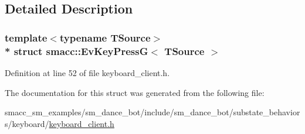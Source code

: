\subsection{Detailed Description}
\subsubsection*{template$<$typename T\+Source$>$\\*
struct smacc\+::\+Ev\+Key\+Press\+G$<$ T\+Source $>$}



Definition at line 52 of file keyboard\+\_\+client.\+h.



The documentation for this struct was generated from the following file\+:\begin{DoxyCompactItemize}
\item 
smacc\+\_\+sm\+\_\+examples/sm\+\_\+dance\+\_\+bot/include/sm\+\_\+dance\+\_\+bot/substate\+\_\+behaviors/keyboard/\hyperlink{keyboard__client_8h}{keyboard\+\_\+client.\+h}\end{DoxyCompactItemize}
